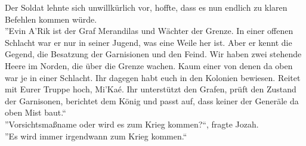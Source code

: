 Der Soldat lehnte sich unwillkürlich vor, hoffte, dass es nun endlich zu klaren Befehlen kommen 
würde.\\
''Evin A'Rik ist der Graf Merandilas und Wächter der Grenze. In einer offenen Schlacht war er nur 
in seiner Jugend, was eine Weile her ist. Aber er kennt die Gegend, die Besatzung der Garnisionen 
und den Feind. Wir haben zwei stehende Heere im Norden, die über die Grenze wachen. Kaum einer von 
denen da oben war je in einer Schlacht. Ihr dagegen habt euch in den Kolonien bewiesen. Reitet mit 
Eurer Truppe hoch, Mi'Kaé. Ihr unterstützt den Grafen, prüft den Zustand der Garnisonen, berichtet 
dem König und passt auf, dass keiner der Generäle da oben Mist baut.``\\
''Vorsichtsmaßname oder wird es zum Krieg kommen?``, fragte Jozah.\\
''Es wird immer irgendwann zum Krieg kommen.``\\

